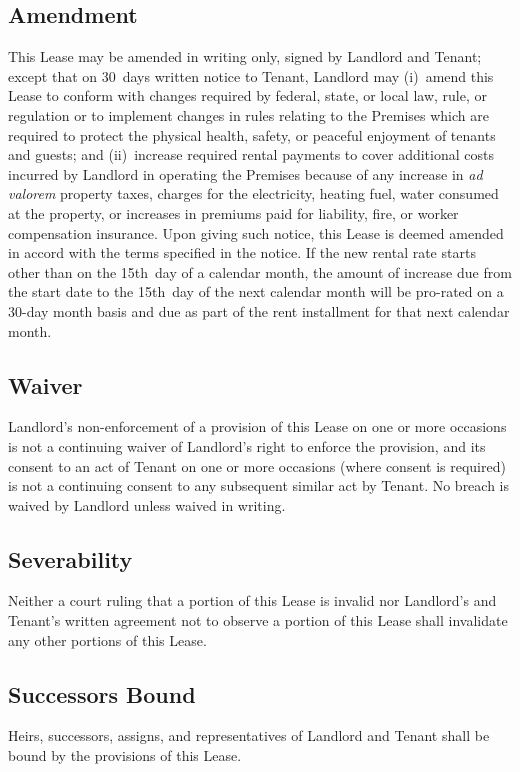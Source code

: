 \documentclass{article}
\begin{document}
\subsection{Amendment}
This Lease may be amended in writing only, signed by Landlord and Tenant; except
that on 30~days written notice to Tenant, Landlord may (i)~amend this Lease to
conform with changes required by federal, state, or local law, rule, or
regulation or to implement changes in rules relating to the Premises which are
required to protect the physical health, safety, or peaceful enjoyment of
tenants and guests; and (ii)~increase required rental payments to cover
additional costs incurred by Landlord in operating the Premises because of any
increase in \textit{ad valorem} property taxes, charges for the electricity,
heating fuel, water consumed at the property, or increases in premiums paid for
liability, fire, or worker compensation insurance. Upon giving such notice, this
Lease is deemed amended in accord with the terms specified in the notice. If the
new rental rate starts other than on the 15th~day of a calendar month, the
amount of increase due from the start date to the 15th~day of the next calendar
month will be pro-rated on a 30-day month basis and due as part of the rent
installment for that next calendar month.

\subsection{Waiver}
Landlord’s non-enforcement of a provision of this Lease on one or more occasions
is not a continuing waiver of Landlord’s right to enforce the provision, and its
consent to an act of Tenant on one or more occasions (where consent is required)
is not a continuing consent to any subsequent similar act by Tenant. No breach
is waived by Landlord unless waived in writing.

\subsection{Severability}
Neither a court ruling that a portion of this Lease is invalid nor Landlord’s
and Tenant’s written agreement not to observe a portion of this Lease shall
invalidate any other portions of this Lease.

\subsection{Successors Bound}
Heirs, successors, assigns, and representatives of Landlord and Tenant shall be
bound by the provisions of this Lease.
\end{document}
